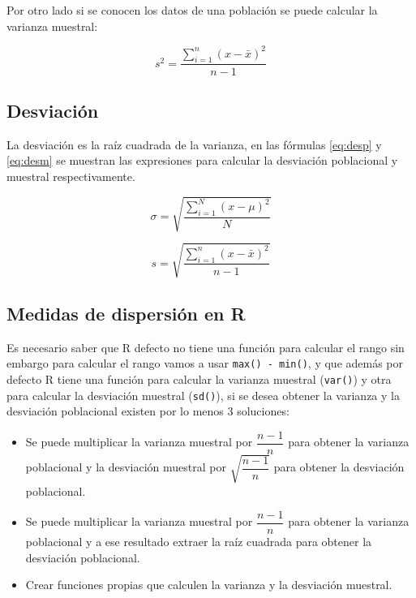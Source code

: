 \documentclass[]{book}
\providecommand{\tightlist}{%
  \setlength{\itemsep}{0pt}\setlength{\parskip}{0pt}}
\begin{document}
Por otro lado si se conocen los datos de una población se puede calcular la varianza muestral:

\begin{equation} 
  s^2 = \dfrac{\sum_{i=1}^{n}\left(x- \bar{x} \right)^2}{n-1}
  \label{eq:varm}
\end{equation}

\hypertarget{desviacion}{%
\subsection{Desviación}\label{desviacion}}

La desviación es la raíz cuadrada de la varianza, en las fórmulas \eqref{eq:desp} y \eqref{eq:desm} se muestran las expresiones para calcular la desviación poblacional y muestral respectivamente.

\begin{equation} 
  \sigma = \sqrt{\dfrac{\sum_{i=1}^{N}\left(x- \mu \right)^2}{N}}
  \label{eq:desp}
\end{equation}

\begin{equation} 
  s = \sqrt{\dfrac{\sum_{i=1}^{n}\left(x- \bar{x} \right)^2}{n-1}}
  \label{eq:desm}
\end{equation}

\hypertarget{medidas-de-dispersion-en-r}{%
\subsection{Medidas de dispersión en R}\label{medidas-de-dispersion-en-r}}

Es necesario saber que R defecto no tiene una función para calcular el rango sin embargo para calcular el rango vamos a usar \texttt{max()\ -\ min()}, y que además por defecto R tiene una función para calcular la varianza muestral (\texttt{var()}) y otra para calcular la desviación muestral (\texttt{sd()}), si se desea obtener la varianza y la desviación poblacional existen por lo menos 3 soluciones:

\begin{itemize}
\tightlist
\item
  Se puede multiplicar la varianza muestral por \(\dfrac{n-1}{n}\) para obtener la varianza poblacional y la desviación muestral por \(\sqrt{\dfrac{n-1}{n}}\) para obtener la desviación poblacional.
\item
  Se puede multiplicar la varianza muestral por \(\dfrac{n-1}{n}\) para obtener la varianza poblacional y a ese resultado extraer la raíz cuadrada para obtener la desviación poblacional.
\item
  Crear funciones propias que calculen la varianza y la desviación muestral.
\end{itemize}
\end{document}
